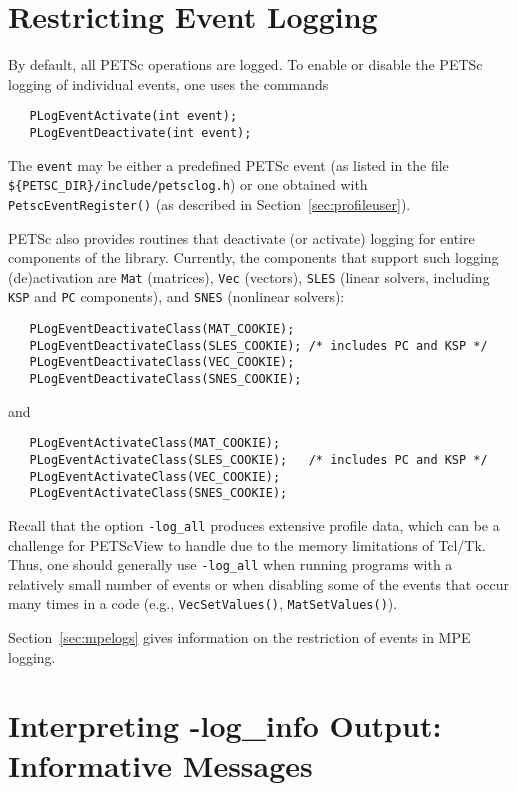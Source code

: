 \section{Restricting Event Logging}
\label{sec:deactivate}

By default, all PETSc operations are logged.
To enable or disable the PETSc logging of individual events, one uses the commands
\begin{verbatim}
   PLogEventActivate(int event);
   PLogEventDeactivate(int event);
\end{verbatim}
The {\tt event} may be either a predefined PETSc event (as listed in
the file {\tt \$\{PETSC\_DIR\}/include/petsclog.h}) or one obtained with
{\tt PetscEventRegister()} (as described in Section~\ref{sec:profileuser}).

PETSc also provides routines that deactivate (or activate)
logging for entire components of the library. Currently, the 
components that support such logging (de)activation are {\tt Mat} (matrices),
{\tt Vec} (vectors), {\tt SLES} (linear solvers, including {\tt KSP} 
and {\tt PC} components), and {\tt SNES} (nonlinear solvers):
\begin{verbatim}
   PLogEventDeactivateClass(MAT_COOKIE);
   PLogEventDeactivateClass(SLES_COOKIE); /* includes PC and KSP */
   PLogEventDeactivateClass(VEC_COOKIE);
   PLogEventDeactivateClass(SNES_COOKIE);
\end{verbatim}
and 
\begin{verbatim}
   PLogEventActivateClass(MAT_COOKIE);
   PLogEventActivateClass(SLES_COOKIE);   /* includes PC and KSP */
   PLogEventActivateClass(VEC_COOKIE);
   PLogEventActivateClass(SNES_COOKIE);
\end{verbatim}

Recall that the option {\tt -log\_all} produces extensive profile
data, which can be a challenge for PETScView to handle due to
the memory limitations of Tcl/Tk.  Thus, one should generally use
{\tt -log\_all} when running programs with a relatively small
number of events or when disabling some of the events that occur many
times in a code (e.g., {\tt VecSetValues()}, {\tt MatSetValues()}).

Section~\ref{sec:mpelogs} gives information on the restriction of events
in MPE logging.


\section{Interpreting -log\_info Output: Informative Messages}
\label{sec:ploginfo}

